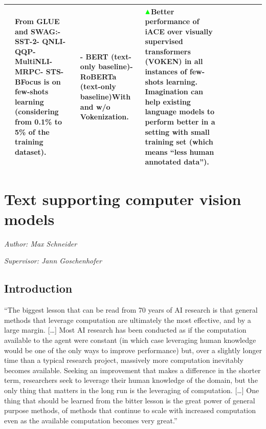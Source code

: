 \documentclass[
]{krantz}
\renewenvironment{quote}{\begin{VF}}{\end{VF}}
\begin{document}
\begin{longtable}[]{@{}llllllllll@{}}
\begin{minipage}[t]{0.25\columnwidth}
\end{minipage} & \begin{minipage}[t]{0.08\columnwidth}\raggedright
From GLUE and SWAG:- SST-2- QNLI- QQP- MultiNLI- MRPC- STS-BFocus is on few-shots learning (considering from 0.1\% to 5\% of the training dataset).\strut
\end{minipage} & \begin{minipage}[t]{0.05\columnwidth}\raggedright
- BERT (text-only baseline)- RoBERTa (text-only baseline)With and w/o Vokenization.\strut
\end{minipage} & \begin{minipage}[t]{0.13\columnwidth}\raggedright
\(\color{green}\blacktriangle\)Better performance of iACE over visually supervised transformers (VOKEN) in all instances of few-shots learning. Imagination can help existing language models to perform better in a setting with small training set (which means ``less human annotated data'').\strut
\end{minipage}\tabularnewline
\bottomrule
\end{longtable}

\hypertarget{c02-04-text-support-img}{%
\section{Text supporting computer vision models}\label{c02-04-text-support-img}}

\emph{Author: Max Schneider}

\emph{Supervisor: Jann Goschenhofer}

\hypertarget{introduction-1}{%
\subsection{Introduction}\label{introduction-1}}

\begin{quote}
``The biggest lesson that can be read from 70 years of AI research is that general methods that leverage computation are ultimately the most effective, and by a large margin.
{[}\ldots{]} Most AI research has been conducted as if the computation available to the agent were constant (in which case leveraging human knowledge would be one of the only ways to improve performance) but, over a slightly longer time than a typical research project, massively more computation inevitably becomes available.
Seeking an improvement that makes a difference in the shorter term, researchers seek to leverage their human knowledge of the domain, but the only thing that matters in the long run is the leveraging of computation.
{[}\ldots{]} One thing that should be learned from the bitter lesson is the great power of general purpose methods, of methods that continue to scale with increased computation even as the available computation becomes very great.''

\end{quote}
\end{document}
